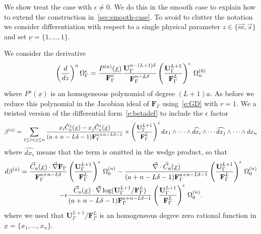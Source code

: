 \documentclass[a4paper,12pt]{article}
\numberwithin{equation}{section}
\numberwithin{figure}{section}
\begin{document}
We show treat the  case with $\epsilon\neq0$. We do this in the smooth
case to explain how to extend the construction
in~\ref{sec:smooth-case}.  To avoid to clutter the
notation we consider differentiation with respect to a single physical
parameter $z\in\{\vec m,\vec s\}$ and set $\underline
\nu=\{1,\dots,1\}$. 


We consider the derivative  
\begin{equation}
 \left(d\over dz\right)^a
 \Omega_\Gamma^\epsilon={P^{(a)}(\underline x)\over
   \textbf{F}_\Gamma^a} { \textbf{U}_\Gamma^{n-(L+1)\delta}\over
   \textbf{F}_\Gamma^{n-L\delta}} \left(\textbf{U}_\Gamma^{L+1}\over
   \textbf{F}_\Gamma^L \right)^\epsilon\,\Omega_n^{(0)}
\end{equation}
where $P^a(\underline x)$ is an homogeneous polynomial of degree $(L+1)a$.
As before we reduce this polynomial in the Jacobian ideal of  $
\textbf{F}_\Gamma$ using~\eqref{e:GD} with $r=1$.
We a twisted version  of the differential form~\eqref{e:betadef} to
include the $\epsilon$ factor
   \begin{equation}\label{e:betadefepsilon}
  \beta^{(a)}=   \sum_{1\leq i<j\leq n} {x_i
    \hat C_{a}^j  (\underline x)-x_j
    \hat C_{a}^i(\underline x)\over (a+n-L\delta-1)\textbf{F}_\Gamma^{a+n-L\delta-1}}\times \left(\textbf{U}_\Gamma^{L+1}\over
   \textbf{F}_\Gamma^L \right)^\epsilon
dx_1\wedge \cdots \wedge \widehat{dx_i}\wedge \cdots \widehat{dx_j}\wedge
  \cdots \wedge dx_n
   \end{equation}
where $\widehat{dx_i}$ means that the term is omitted in the wedge
product,   so that
   \begin{multline}
     d\beta^{(a)}= {    \vec C_{a}
     (\underline x)\cdot\vec\nabla
   \textbf{F}_\Gamma\over
     \textbf{F}_\Gamma^{a+n-L\delta}}\left(\textbf{U}_\Gamma^{L+1}\over
   \textbf{F}_\Gamma^L \right)^\epsilon\,\Omega_0^{(n)}- {
     \vec\nabla\cdot \vec C_{a}
     (\underline x)
    \over  (a+n-L\delta-1)  \textbf{F}_\Gamma^{a+n-L\delta-1}}\left(\textbf{U}_\Gamma^{L+1}\over
    \textbf{F}_\Gamma^L \right)^\epsilon\, \Omega_0^{(n)}\cr
  -\epsilon {
     \vec C_{a}
     (\underline x) \cdot\vec\nabla \log(\textbf{U}_\Gamma^{L+1}/
    \textbf{F}_\Gamma^L )
    \over  (a+n-L\delta-1)
    \textbf{F}_\Gamma^{a+n-L\delta-1}}\left(\textbf{U}_\Gamma^{L+1}\over 
    \textbf{F}_\Gamma^L \right)^\epsilon\, \Omega_0^{(n)}.
   \end{multline}
where we used that $\textbf{U}_\Gamma^{L+1}/
   \textbf{F}_\Gamma^L$ is an homogeneous degree zero rational
   function in $\underline x=\{x_1,\dots,x_n\}$.
\end{document}
